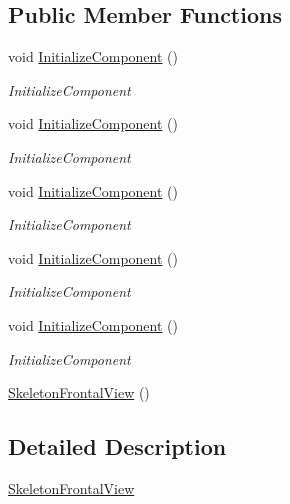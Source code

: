 \subsection*{Public Member Functions}
\begin{DoxyCompactItemize}
\item 
void \hyperlink{class_rowing_monitor_1_1_view_1_1_skeleton_frontal_view_a47e693425fedb725291469b158ff9625}{Initialize\+Component} ()
\begin{DoxyCompactList}\small\item\em Initialize\+Component \end{DoxyCompactList}\item 
void \hyperlink{class_rowing_monitor_1_1_view_1_1_skeleton_frontal_view_a47e693425fedb725291469b158ff9625}{Initialize\+Component} ()
\begin{DoxyCompactList}\small\item\em Initialize\+Component \end{DoxyCompactList}\item 
void \hyperlink{class_rowing_monitor_1_1_view_1_1_skeleton_frontal_view_a47e693425fedb725291469b158ff9625}{Initialize\+Component} ()
\begin{DoxyCompactList}\small\item\em Initialize\+Component \end{DoxyCompactList}\item 
void \hyperlink{class_rowing_monitor_1_1_view_1_1_skeleton_frontal_view_a47e693425fedb725291469b158ff9625}{Initialize\+Component} ()
\begin{DoxyCompactList}\small\item\em Initialize\+Component \end{DoxyCompactList}\item 
void \hyperlink{class_rowing_monitor_1_1_view_1_1_skeleton_frontal_view_a47e693425fedb725291469b158ff9625}{Initialize\+Component} ()
\begin{DoxyCompactList}\small\item\em Initialize\+Component \end{DoxyCompactList}\item 
\hyperlink{class_rowing_monitor_1_1_view_1_1_skeleton_frontal_view_a7ebe4cc1a0aa4d317d2f15b99ebada40}{Skeleton\+Frontal\+View} ()
\end{DoxyCompactItemize}


\subsection{Detailed Description}
\hyperlink{class_rowing_monitor_1_1_view_1_1_skeleton_frontal_view}{Skeleton\+Frontal\+View} 


